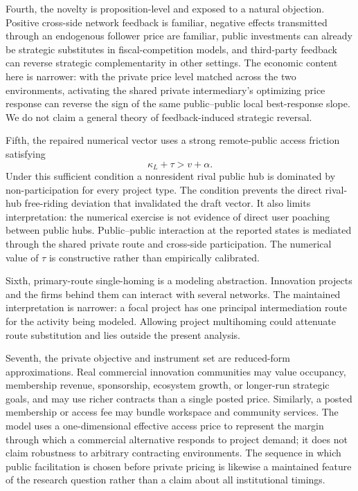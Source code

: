 Fourth, the novelty is proposition-level and exposed to a natural objection. Positive cross-side network feedback is familiar, negative effects transmitted through an endogenous follower price are familiar, public investments can already be strategic substitutes in fiscal-competition models, and third-party feedback can reverse strategic complementarity in other settings. The economic content here is narrower: with the private price level matched across the two environments, activating the shared private intermediary's optimizing price response can reverse the sign of the same public--public local best-response slope. We do not claim a general theory of feedback-induced strategic reversal.

Fifth, the repaired numerical vector uses a strong remote-public access friction satisfying
\[
\kappa_L+\tau>v+\alpha.
\]
Under this sufficient condition a nonresident rival public hub is dominated by non-participation for every project type. The condition prevents the direct rival-hub free-riding deviation that invalidated the draft vector. It also limits interpretation: the numerical exercise is not evidence of direct user poaching between public hubs. Public--public interaction at the reported states is mediated through the shared private route and cross-side participation. The numerical value of $\tau$ is constructive rather than empirically calibrated.

Sixth, primary-route single-homing is a modeling abstraction. Innovation projects and the firms behind them can interact with several networks. The maintained interpretation is narrower: a focal project has one principal intermediation route for the activity being modeled. Allowing project multihoming could attenuate route substitution and lies outside the present analysis.

Seventh, the private objective and instrument set are reduced-form approximations. Real commercial innovation communities may value occupancy, membership revenue, sponsorship, ecosystem growth, or longer-run strategic goals, and may use richer contracts than a single posted price. Similarly, a posted membership or access fee may bundle workspace and community services. The model uses a one-dimensional effective access price to represent the margin through which a commercial alternative responds to project demand; it does not claim robustness to arbitrary contracting environments. The sequence in which public facilitation is chosen before private pricing is likewise a maintained feature of the research question rather than a claim about all institutional timings.

